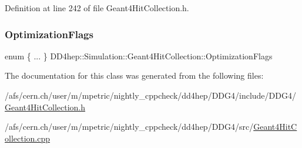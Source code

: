 Definition at line 242 of file Geant4\+Hit\+Collection.\+h.

\hypertarget{class_d_d4hep_1_1_simulation_1_1_geant4_hit_collection_a7f71d7699e398712740081192f4dd846}{}\label{class_d_d4hep_1_1_simulation_1_1_geant4_hit_collection_a7f71d7699e398712740081192f4dd846} 
\subsubsection{\texorpdfstring{Optimization\+Flags}{OptimizationFlags}}
{\footnotesize\ttfamily enum \{ ... \}   D\+D4hep\+::\+Simulation\+::\+Geant4\+Hit\+Collection\+::\+Optimization\+Flags}



The documentation for this class was generated from the following files\+:\begin{DoxyCompactItemize}
\item 
/afs/cern.\+ch/user/m/mpetric/nightly\+\_\+cppcheck/dd4hep/\+D\+D\+G4/include/\+D\+D\+G4/\hyperlink{_geant4_hit_collection_8h}{Geant4\+Hit\+Collection.\+h}\item 
/afs/cern.\+ch/user/m/mpetric/nightly\+\_\+cppcheck/dd4hep/\+D\+D\+G4/src/\hyperlink{_geant4_hit_collection_8cpp}{Geant4\+Hit\+Collection.\+cpp}\end{DoxyCompactItemize}
